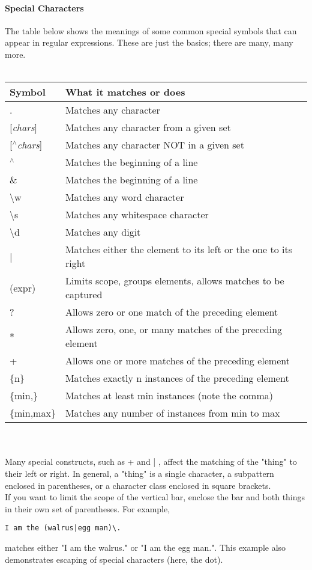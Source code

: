 \documentclass[10pt,letterpaper]{book}
\begin{document}
\paragraph*{Special Characters}
The table below shows the meanings of some common special symbols that can appear in regular expressions. These are just the basics; there are many, many more.\\
\\
\begin{tabular}{l l}
\hline
\textbf{Symbol} & \textbf{What it matches or does}\\
\hline 
. & Matches any character\\
{[}\textit{chars}{]} & Matches any character from a given set\\
{[}\textit{$ ^\wedge $chars}{]} & Matches any character NOT in a given set\\
$ ^\wedge $ & Matches the beginning of a line\\
\& & Matches the beginning of a line\\
\textbackslash w & Matches any word character\\
\textbackslash s & Matches any whitespace character\\
\textbackslash d & Matches any digit\\
\hline
| & Matches either the element to its left or the one to its right\\
(expr) & Limits scope, groups elements, allows matches to be captured\\
\hline
? & Allows zero or one match of the preceding element\\
* & Allows zero, one, or many matches of the preceding element\\
+ & Allows one or more matches of the preceding element\\
\{n\} & Matches exactly n instances of the preceding element\\
\{min,\} & Matches at least min instances (note the comma)\\
\{min,max\} & Matches any number of instances from min to max\\
\hline
\end{tabular}
\\
\\
Many special constructs, such as + and | , affect the matching of the "thing" to their left or right. In general, a "thing" is a single character, a subpattern enclosed in parentheses, or a character class enclosed in square brackets.\\
If you want to limit the scope of the vertical bar, enclose the bar and both things in their own set of parentheses. For example,
\begin{lstlisting}
I am the (walrus|egg man)\.
\end{lstlisting}
matches either "I am the walrus." or "I am the egg man.". This example also demonstrates escaping of special characters (here, the dot).
\end{document}
